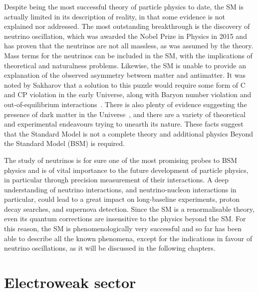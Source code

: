 Despite being the most successful theory of particle physics to date, the SM is actually limited %
in its description of reality, in that some evidence is not explained nor addressed.
The most outstanding breakthrough is the discovery of neutrino oscillation, which was awarded the Nobel Prize in Physics in 2015 %
and has proven that the neutrinos are not all massless, as was assumed by the theory.	%
Mass terms for the neutrinos can be included in the SM, with the implications of theoretical and naturalness problems.
Likewise, the SM is unable to provide an explanation of the observed asymmetry between matter and antimatter.
It was noted by Sakharov that a solution to this puzzle would require some form of C and CP violation %
in the early Universe, along with Baryon number violation and out-of-equilibrium interactions~\cite{Sakharov:1967dj}.
There is also plenty of evidence suggesting the presence of dark matter %
in the Universe~\cite{Zwicky:1933gu, Rubin:1970zza, Aghanim:2018eyx}, %
and there are a variety of theoretical and experimental endeavours trying to unearth its nature.
These facts suggest that the Standard Model is not a complete theory and additional physics %
Beyond the Standard Model (BSM) is required.

The study of neutrinos is for sure one of the most promising probes to BSM physics and %
is of vital importance to the future development of particle physics, %
in particular through precision measurement of their interactions.
A deep understanding of neutrino interactions, and neutrino-nucleon interactions in particular, %
could lead to a great impact on long-baseline experiments, proton decay searches, and supernova detection.
Since the SM is a renormalisable theory, even its quantum corrections are insensitive to the physics beyond the SM.
For this reason, the SM is phenomenologically very successful and so far has been able to describe all the known
phenomena, except for the indications in favour of neutrino oscillations, as it will be discussed in the following chapters.

\section{Electroweak sector}
\label{sec:ew_sector}

